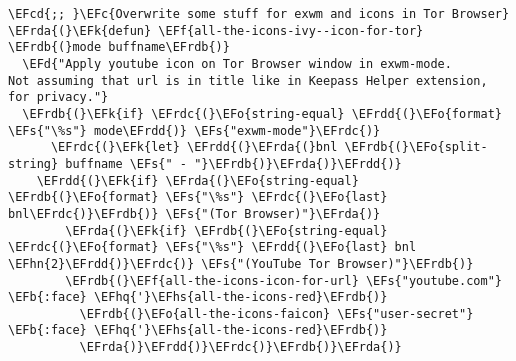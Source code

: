 \documentclass[a4wide,10pt]{article}
\newcommand{\EFc}[1]{\textcolor{EFc}{#1}} %
\newcommand{\EFcd}[1]{\textcolor{EFcd}{#1}} %
\newcommand{\EFs}[1]{\textcolor{EFs}{#1}} %
\newcommand{\EFd}[1]{\textcolor{EFd}{#1}} %
\newcommand{\EFk}[1]{\textcolor{EFk}{#1}} %
\newcommand{\EFb}[1]{\textcolor{EFb}{#1}} %
\newcommand{\EFf}[1]{\textcolor{EFf}{#1}} %
\newcommand{\EFo}[1]{\textcolor{EFo}{#1}} %
\newcommand{\EFhn}[1]{\textcolor{EFhn}{\textbf{#1}}} %
\newcommand{\EFhq}[1]{\textcolor{EFhq}{#1}} %
\newcommand{\EFhs}[1]{\textcolor{EFhs}{#1}} %
\newcommand{\EFrda}[1]{\textcolor{EFrda}{#1}} %
\newcommand{\EFrdb}[1]{\textcolor{EFrdb}{#1}} %
\newcommand{\EFrdc}[1]{\textcolor{EFrdc}{#1}} %
\newcommand{\EFrdd}[1]{\textcolor{EFrdd}{#1}} %
\begin{document}
\begin{Code}
\begin{Verbatim}
\EFcd{;; }\EFc{Overwrite some stuff for exwm and icons in Tor Browser}
\EFrda{(}\EFk{defun} \EFf{all-the-icons-ivy--icon-for-tor} \EFrdb{(}mode buffname\EFrdb{)}
  \EFd{"Apply youtube icon on Tor Browser window in exwm-mode.
Not assuming that url is in title like in Keepass Helper extension, for privacy."}
  \EFrdb{(}\EFk{if} \EFrdc{(}\EFo{string-equal} \EFrdd{(}\EFo{format} \EFs{"\%s"} mode\EFrdd{)} \EFs{"exwm-mode"}\EFrdc{)}
      \EFrdc{(}\EFk{let} \EFrdd{(}\EFrda{(}bnl \EFrdb{(}\EFo{split-string} buffname \EFs{" - "}\EFrdb{)}\EFrda{)}\EFrdd{)}
	\EFrdd{(}\EFk{if} \EFrda{(}\EFo{string-equal} \EFrdb{(}\EFo{format} \EFs{"\%s"} \EFrdc{(}\EFo{last} bnl\EFrdc{)}\EFrdb{)} \EFs{"(Tor Browser)"}\EFrda{)}
	    \EFrda{(}\EFk{if} \EFrdb{(}\EFo{string-equal} \EFrdc{(}\EFo{format} \EFs{"\%s"} \EFrdd{(}\EFo{last} bnl \EFhn{2}\EFrdd{)}\EFrdc{)} \EFs{"(YouTube Tor Browser)"}\EFrdb{)}
		\EFrdb{(}\EFf{all-the-icons-icon-for-url} \EFs{"youtube.com"} \EFb{:face} \EFhq{'}\EFhs{all-the-icons-red}\EFrdb{)}
	      \EFrdb{(}\EFo{all-the-icons-faicon} \EFs{"user-secret"} \EFb{:face} \EFhq{'}\EFhs{all-the-icons-red}\EFrdb{)}
	      \EFrda{)}\EFrdd{)}\EFrdc{)}\EFrdb{)}\EFrda{)}


\end{Verbatim}
\end{Code}
\end{document}
